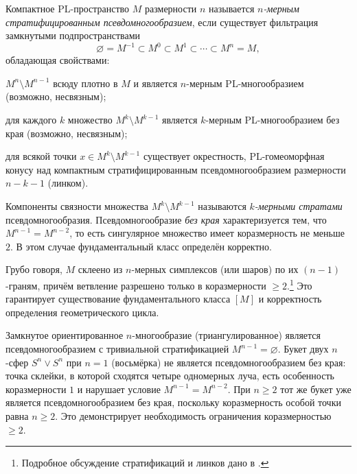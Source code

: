 \documentclass[12pt]{article}
\begin{document}
\begin{definition}\label{def:psmv}
Компактное PL-пространство $M$ размерности $n$ называется \emph{$n$-мерным стратифицированным псевдомногообразием}, если существует фильтрация замкнутыми подпространствами
\begin{equation}
    \varnothing = M^{-1} \subset M^0 \subset M^1 \subset \cdots \subset M^n = M,
\end{equation}
обладающая свойствами:
\begin{conditions}
\item $M^n \setminus M^{n-1}$ всюду плотно в $M$ и является $n$-мерным PL-многообразием (возможно, несвязным);
\item для каждого $k$ множество $M^k \setminus M^{k-1}$ является $k$-мерным PL-многообразием без края (возможно, несвязным);
\item для всякой точки $x \in M^k \setminus M^{k-1}$ существует окрестность, PL-гомеоморфная конусу над компактным стратифицированным псевдомногообразием размерности $n-k-1$ (линком).
\end{conditions}
Компоненты связности множества $M^k \setminus M^{k-1}$ называются \emph{$k$-мерными стратами} псевдомногообразия.
Псевдомногообразие \emph{без края} характеризуется тем, что $M^{n-1} = M^{n-2}$, то есть сингулярное множество имеет коразмерность не меньше $2$. В этом случае фундаментальный класс определён корректно.
\end{definition}

Грубо говоря, $M$ склеено из $n$-мерных симплексов (или шаров) по их $(n-1)$-граням, причём ветвление разрешено только в коразмерности $\ge 2$.\footnote{Подробное обсуждение стратификаций и линков дано в \cite[Гл.~I, §1]{BRS}.} Это гарантирует существование фундаментального класса $[M]$ и корректность определения геометрического цикла.

\begin{example}
Замкнутое ориентированное $n$-многообразие (триангулированное) является псевдомногообразием с тривиальной стратификацией $M^{n-1}=\varnothing$. Букет двух $n$-сфер $S^n \vee S^n$ при $n=1$ (восьмёрка) не является псевдомногообразием без края: точка склейки, в которой сходятся четыре одномерных луча, есть особенность коразмерности $1$ и нарушает условие $M^{n-1}=M^{n-2}$. При $n\ge 2$ тот же букет уже является псевдомногообразием без края, поскольку коразмерность особой точки равна $n\ge 2$. Это демонстрирует необходимость ограничения коразмерностью $\ge 2$.
\end{example}
\end{document}

